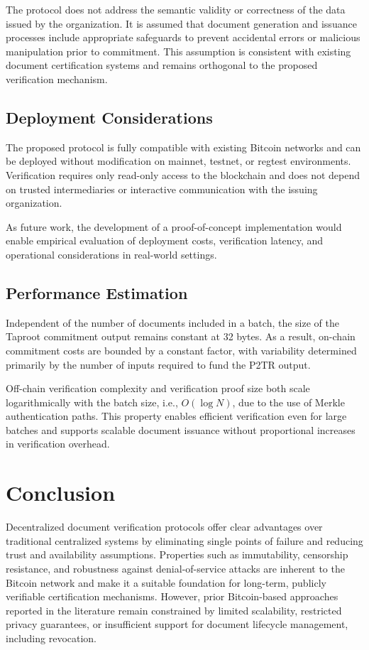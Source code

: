 \documentclass{ieeeaccess}
\begin{document}
The protocol does not address the semantic validity or correctness of the data issued by the organization.
It is assumed that document generation and issuance processes include appropriate safeguards to prevent accidental errors or malicious manipulation prior to commitment.
This assumption is consistent with existing document certification systems and remains orthogonal to the proposed verification mechanism.

\subsection{Deployment Considerations}

The proposed protocol is fully compatible with existing Bitcoin networks and can be deployed without modification on mainnet, testnet, or regtest environments.
Verification requires only read-only access to the blockchain and does not depend on trusted intermediaries or interactive communication with the issuing organization.

As future work, the development of a proof-of-concept implementation would enable empirical evaluation of deployment costs, verification latency, and operational considerations in real-world settings.

\subsection{Performance Estimation}

Independent of the number of documents included in a batch, the size of the Taproot commitment output remains constant at 32 bytes.
As a result, on-chain commitment costs are bounded by a constant factor, with variability determined primarily by the number of inputs required to fund the P2TR output.

Off-chain verification complexity and verification proof size both scale logarithmically with the batch size, i.e., $O(\log N)$, due to the use of Merkle authentication paths.
This property enables efficient verification even for large batches and supports scalable document issuance without proportional increases in verification overhead.



\section{Conclusion}
\label{sec_Conclusion}

Decentralized document verification protocols offer clear advantages over traditional centralized systems by eliminating single points of failure and reducing trust and availability assumptions.
Properties such as immutability, censorship resistance, and robustness against denial-of-service attacks are inherent to the Bitcoin network and make it a suitable foundation for long-term, publicly verifiable certification mechanisms.
However, prior Bitcoin-based approaches reported in the literature remain constrained by limited scalability, restricted privacy guarantees, or insufficient support for document lifecycle management, including revocation.
\end{document}
